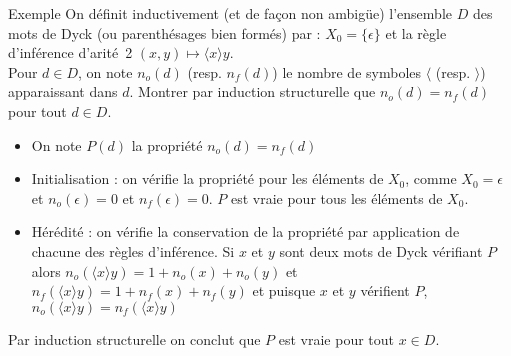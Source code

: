 \documentclass[10pt]{beamer}
\begin{document}
\begin{frame}[fragile]{\Ctitle}{\stitle}
    \begin{exampleblock}{Exemple}
        On définit inductivement (et de façon non ambigüe) l'ensemble $D$ des mots de Dyck (ou parenthésages bien formés) par : $X_0 = \{\epsilon\}$ et la règle d'inférence d'arité~2 $(x,y) \mapsto \boldsymbol{\langle}x\boldsymbol{\rangle}y$.\\
        \smallskip
        Pour $d \in D$, on note $n_o(d)$ (resp. $n_f(d)$) le nombre de symboles $\boldsymbol{\langle}$ (resp. $\boldsymbol{\rangle}$) apparaissant dans $d$. Montrer par induction structurelle que $n_o(d) = n_f(d)$ pour tout $d \in D$.
        \begin{itemize}
        \item<2-> \textcolor{OliveGreen}{On note $P(d)$ la propriété $n_o(d) = n_f(d)$}
        \item<3-> \textcolor{OliveGreen}{Initialisation : on vérifie la propriété pour les éléments de $X_0$, comme $X_0 = {\epsilon}$ et $n_o(\epsilon)=0$ et $n_f(\epsilon)=0$. $P$ est vraie pour tous les éléments de $X_0$.}
        \item<4-> \textcolor{OliveGreen}{Hérédité : on vérifie la conservation de la propriété par application de chacune des règles d'inférence. Si $x$ et $y$ sont deux mots de Dyck vérifiant $P$ alors $n_o(\boldsymbol{\langle}x\boldsymbol{\rangle}y) = 1 + n_o(x) + n_o(y)$ et $n_f(\boldsymbol{\langle}x\boldsymbol{\rangle}y) = 1 + n_f(x) + n_f(y)$ et puisque $x$ et $y$ vérifient $P$, $n_o(\boldsymbol{\langle}x\boldsymbol{\rangle}y) = n_f(\boldsymbol{\langle}x\boldsymbol{\rangle}y)$ }
        \end{itemize}
        \textcolor{OliveGreen}{Par induction structurelle on conclut que $P$ est vraie pour tout $x \in D$.}
    \end{exampleblock}
\end{frame}
\end{document}
